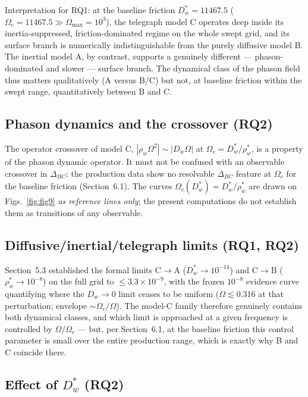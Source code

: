 \documentclass[11pt]{article}
\newcommand{\Om}{\Omega}
\newcommand{\Dw}{D_w}
\newcommand{\rw}{\rho_w}
\begin{document}
Interpretation for RQ1: at the baseline friction $D_w^*=11467.5$ ($\Om_c=11467.5\gg\Om_{\max}=10^3$), the telegraph model C operates deep inside its inertia-suppressed, friction-dominated regime on the whole swept grid, and its surface branch is numerically indistinguishable from the purely diffusive model B. The inertial model A, by contrast, supports a genuinely different --- phason-dominated and slower --- surface branch. The dynamical class of the phason field thus matters qualitatively (A versus B/C) but not, at baseline friction within the swept range, quantitatively between B and C.

\subsection{Phason dynamics and the crossover (RQ2)}

The operator crossover of model C, $|\rw\Om^2|\sim|\Dw\Om|$ at $\Om_c=D_w^*/\rw^*$, is a property of the phason dynamic operator. It must not be confused with an observable crossover in $\Delta_{BC}$: the production data show no resolvable $\Delta_{BC}$ feature at $\Om_c$ for the baseline friction (Section~6.1). The curves $\Om_c(D_w^*)=D_w^*/\rw^*$ are drawn on Figs.~\ref{fig:fig9} \emph{as reference lines only}; the present computations do not establish them as transitions of any observable.

\subsection{Diffusive/inertial/telegraph limits (RQ1, RQ2)}

Section~5.3 established the formal limits C$\to$A ($D_w^*\to10^{-14}$) and C$\to$B ($\rw^*\to10^{-8}$) on the full grid to $\le3.3\times10^{-9}$, with the frozen $10^{-8}$ evidence curve quantifying where the $\Dw\to0$ limit ceases to be uniform ($\Om\lesssim0.316$ at that perturbation; envelope $\sim\Om_c/\Om$). The model-C family therefore genuinely contains both dynamical classes, and which limit is approached at a given frequency is controlled by $\Om/\Om_c$ --- but, per Section~6.1, at the baseline friction this control parameter is small over the entire production range, which is exactly why B and C coincide there.

\subsection{Effect of $D_w^*$ (RQ2)}
\end{document}
